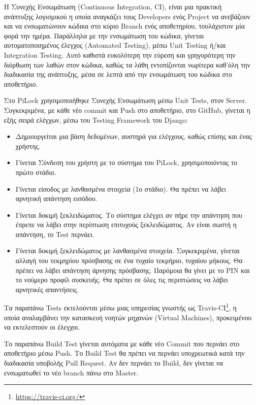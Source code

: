 \label{ch:ci}
Η Συνεχής Ενσωμάτωση (Continuous Integration, CI), είναι μια πρακτική ανάπτυξης λογισμικού η οποία αναγκάζει τους Developers ενός Project να ανεβάζουν και να ενσωματώνουν κώδικα στο κύριο Branch ενός αποθετηρίου, τουλάχιστον μία φορά την ημέρα. Παράλληλα με την ενσωμάτωση του κώδικα, γίνεται αυτοματοποιημένος έλεγχος (Automated Testing), μέσω Unit Testing ή/και Integration Testing. Αυτό καθιστά ευκολότερη την εύρεση και γρηγορότερη την διόρθωση των λαθών στον κώδικα, καθώς τα λάθη εντοπίζονται νωρίτερα καθ'όλη την διαδικασία της ανάπτυξης, μέσα σε λεπτά από την ενσωμάτωση του κώδικα στο αποθετήριο.

Στο PiLock χρησιμοποιήθηκε Συνεχής Ενσωμάτωση μέσω Unit Tests, στον Server. Συγκεκριμένα, με κάθε νέο commit και Push στο αποθετήριο, στο GitHub, γίνεται η εξής σειρά ελέγχων, μέσω του Testing Framework του Django:

\begin{itemize}
	\item Δημιουργείται μια βάση δεδομένων, αυστηρά για ελέγχους, καθώς επίσης και ένας χρήστης.
	\item Γίνεται Σύνδεση του χρήστη με το σύστημα του PiLock, χρησιμοποιόντας το πρώτο στάδιο.
	\item Γίνεται είσοδος με λανθασμένα στοιχεία (1ο στάδιο). Θα πρέπει να λάβει αρνητική απάντηση εισόδου.
	\item Γίνεται δοκιμή ξεκλειδώματος. Το σύστημα ελέγχει αν πήρε την απάντηση που έπρεπε να λάβει στην περίπτωση επιτυχούς ξεκλειδώματος. Αν είναι σωστή η απάντηση, το Test περνάει.
	\item Γίνεται δοκιμή ξεκλειδώματος με λανθασμένα στοιχεία. Συγκεκριμένα, γίνεται αλλαγή του τεκμηρίου πρόσβασης σε ένα τυχαίο τεκμήριο, τυχαίου μήκους. Θα πρέπει να λάβει απάντηση άρνησης πρόσβασης. Παρόμοια θα γίνει με το PIN και το νούμερο προφίλ συσκευής. Θα πρέπει σε όλες τις περιπτώσεις να λάβει αρνητικές απαντήσεις.
\end{itemize}

Τα παραπάνω Tests εκτελούνται μέσω μιας υπηρεσίας γνωστής ως Travis-CI\footnote{\url{https://travis-ci.org/}}, η οποία αναλαμβάνει την κατασκευή νοητών μηχανών (Virtual Machines), προκειμένου να εκτελεστούν οι έλεγχοι.

Το παραπάνω Build Test γίνεται αυτόματα με κάθε νέο Commit που περνάει στο αποθετήριο μέσω Push. Το Build Test θα πρέπει να περνάει υποχρεωτικά κατά την διαδικασία υποβολής Pull Request. Αν δεν περνάει το Build, δεν γίνεται να ενσωματωθεί το νέο branch πάνω στο Master.